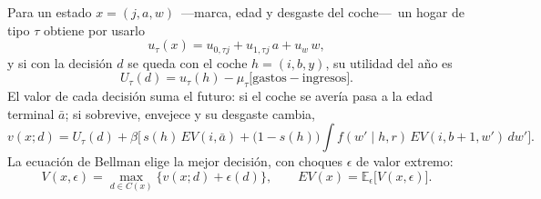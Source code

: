 \documentclass[border=0pt]{standalone}
\begin{document}
\begin{minipage}{26.783cm}\fontsize{27}{33.5}\selectfont\raggedright 
Para un estado $x=(j,a,w)$ \,---marca, edad y desgaste del coche---\, un hogar de
tipo $\tau$ obtiene por usarlo
\[ u_\tau(x)=u_{0,\tau j}+u_{1,\tau j}\,a+u_w\,w , \]
y si con la decisión $d$ se queda con el coche $h=(i,b,y)$, su utilidad del año es
\[ U_\tau(d)=u_\tau(h)-\mu_\tau\Big[\text{gastos}-\text{ingresos}\Big]. \]
El valor de cada decisión suma el futuro: si el coche se avería pasa a la edad
terminal $\bar a$; si sobrevive, envejece y su desgaste cambia,
\[ v(x;d)=U_\tau(d)+\beta\Big[\,s(h)\,EV(i,\bar a)
   +\big(1-s(h)\big)\!\int\! f(w'\mid h,r)\,EV(i,b{+}1,w')\,dw'\Big]. \]
La ecuación de Bellman elige la mejor decisión, con choques $\epsilon$ de valor
extremo:
\[ V(x,\epsilon)=\max_{d\in C(x)}\Big\{v(x;d)+\epsilon(d)\Big\},\qquad
   EV(x)=\mathbb{E}_\epsilon\Big[V(x,\epsilon)\Big]. \]
\end{minipage}
\end{document}

